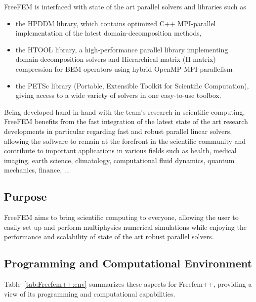 FreeFEM is interfaced with state of the art parallel solvers and libraries such as

\begin{itemize}
\item the HPDDM library, which contains optimized C++ MPI-parallel implementation of the latest domain-decomposition methods,
\item the HTOOL library, a high-performance parallel library implementing domain-decomposition solvers and Hierarchical matrix (H-matrix)
compression for BEM operators using hybrid OpenMP-MPI parallelism
\item the PETSc library (Portable, Extensible Toolkit for Scientific Computation), giving access to a wide variety of solvers in one easy-to-use toolbox.
\end{itemize}

Being developed hand-in-hand with the team's research in scientific computing, FreeFEM benefits from the fast integration of the latest state of the art research developments in particular regarding fast and robust parallel linear solvers, allowing the software to remain at the forefront in the scientific community and contribute to important applications in various fields such as health, medical imaging, earth science, climatology, computational fluid dynamics, quantum mechanics, finance, ...

\subsection{Purpose}
\label{sec:Freefem++:purpose}

FreeFEM aims to bring scientific computing to everyone, allowing the user to easily set up and perform multiphysics numerical simulations while enjoying the performance and scalability of state of the art robust parallel solvers.

\subsection{Programming and Computational Environment}
\label{sec::Freefem++:environment_capabilities}


Table~\ref{tab:Freefem++:env} summarizes these aspects for Freefem++, providing a  view of its programming and computational capabilities.

